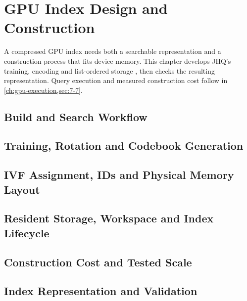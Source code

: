 \chapter{GPU Index Design and Construction}
\label{ch:architecture}
A compressed GPU index needs both a searchable representation and a
construction process that fits device memory. This chapter develops
JHQ's training, encoding and list-ordered storage \cite{jhq}, then checks
the resulting representation. Query execution and measured construction
cost follow in \cref{ch:gpu-execution,sec:7-7}.

\section{Build and Search Workflow}
\label{sec:4-1}


\section{Training, Rotation and Codebook Generation}
\label{sec:4-2}


\section{IVF Assignment, IDs and Physical Memory Layout}
\label{sec:4-3}


\section{Resident Storage, Workspace and Index Lifecycle}
\label{sec:4-4}


\section{Construction Cost and Tested Scale}
\label{sec:4-5}


\section{Index Representation and Validation}
\label{sec:4-6}

